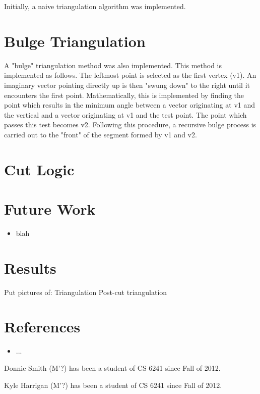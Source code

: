 \documentclass[letterpaper,10pt]{IEEEtran}
\begin{document}
Initially, a naive triangulation algorithm was implemented.  

\section{Bulge Triangulation}
A "bulge" triangulation method was also implemented.  This method is implemented as follows.  The leftmost point is selected as the first vertex (v1).  An imaginary vector pointing directly up is then "swung down" to the right until it encounters the first point.  Mathematically, this is implemented by finding the point which results in the minimum angle between a vector originating at v1 and the vertical and a vector originating at v1 and the test point.  The point which passes this test becomes v2.  
Following this procedure, a recursive bulge process is carried out to the "front" of the segment formed by v1 and v2.     

\section{Cut Logic}

 \section{Future Work}
  \begin{multicols}{2}
 \begin{itemize}
\item blah
\end{itemize}
\end{multicols} 

\section{Results}
Put pictures of:
Triangulation
Post-cut triangulation
\section{References}
\begin{itemize}
\itemsep0em
\item ...
\end{itemize}

\begin{IEEEbiography}{Donnie Smith} 
(M'?)  has been a student of CS 6241 since Fall of 2012.  
\end{IEEEbiography}

\begin{IEEEbiography}{Kyle Harrigan} 
(M'?) has been a student of CS 6241 since Fall of 2012.  
\end{IEEEbiography}
\end{document}
